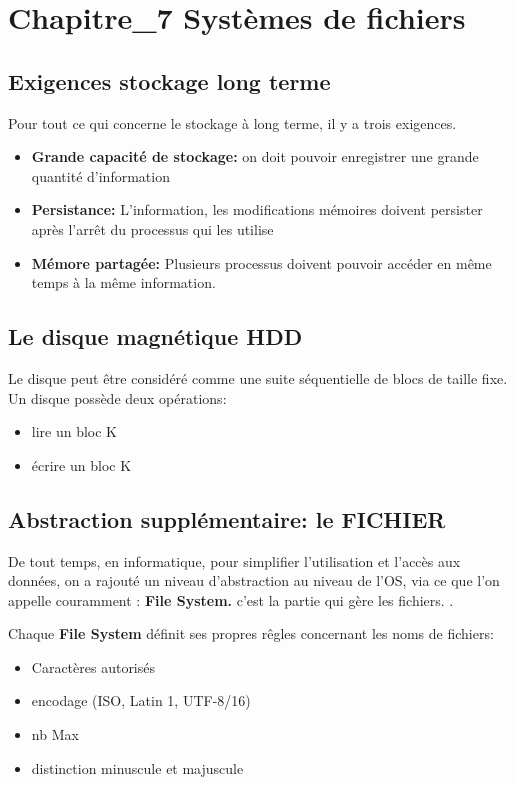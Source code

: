 \newpage
\section{Chapitre\_7 Systèmes de fichiers}

\subsection{Exigences stockage long terme}
Pour tout ce qui concerne le stockage à long terme, il y a trois exigences.
\begin{itemize}
    \item \textbf{Grande capacité de stockage: } on doit pouvoir enregistrer une grande quantité d'information
    \item \textbf{Persistance: }L'information, les modifications mémoires doivent persister après l'arrêt du processus qui les utilise
    \item \textbf{Mémore partagée: }Plusieurs processus doivent pouvoir accéder en même temps à la même information.
\end{itemize}

\subsection{Le disque magnétique HDD}
Le disque peut être considéré comme une suite séquentielle de blocs de taille fixe. Un disque possède deux opérations:
\begin{itemize}
    \item lire un bloc K
    \item écrire un bloc K
\end{itemize}

\subsection{Abstraction supplémentaire: le FICHIER}
De tout temps, en informatique, pour simplifier l'utilisation et l'accès aux données, on a rajouté un niveau d'abstraction au niveau de l'OS, via ce que l'on appelle couramment : \textbf{File System.} c'est la partie qui gère les fichiers.
.

Chaque \textbf{File System} définit ses propres rêgles concernant les noms de fichiers:
\begin{itemize}
    \item Caractères autorisés
    \item encodage (ISO, Latin 1, UTF-8/16)
    \item nb Max
    \item distinction minuscule et majuscule
\end{itemize}

